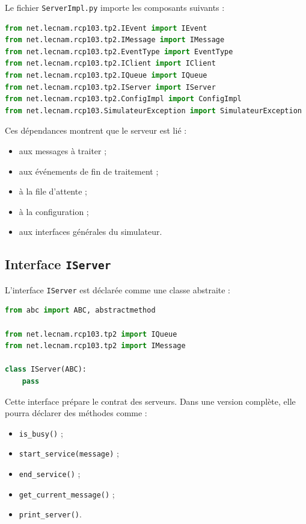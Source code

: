 \documentclass{article}
\begin{document}
Le fichier \texttt{ServerImpl.py} importe les composants suivants :

\begin{lstlisting}[language=Python, caption=Imports principaux de ServerImpl.py]
from net.lecnam.rcp103.tp2.IEvent import IEvent
from net.lecnam.rcp103.tp2.IMessage import IMessage
from net.lecnam.rcp103.tp2.EventType import EventType
from net.lecnam.rcp103.tp2.IClient import IClient
from net.lecnam.rcp103.tp2.IQueue import IQueue
from net.lecnam.rcp103.tp2.IServer import IServer
from net.lecnam.rcp103.tp2.ConfigImpl import ConfigImpl
from net.lecnam.rcp103.SimulateurException import SimulateurException
\end{lstlisting}

Ces dépendances montrent que le serveur est lié :
\begin{itemize}[leftmargin=*]
    \item aux messages à traiter ;
    \item aux événements de fin de traitement ;
    \item à la file d’attente ;
    \item à la configuration ;
    \item aux interfaces générales du simulateur.
\end{itemize}

\subsection{Interface \texttt{IServer}}

L’interface \texttt{IServer} est déclarée comme une classe abstraite :

\begin{lstlisting}[language=Python, caption=Structure de IServer.py]
from abc import ABC, abstractmethod

from net.lecnam.rcp103.tp2 import IQueue
from net.lecnam.rcp103.tp2 import IMessage

class IServer(ABC):
    pass
\end{lstlisting}

Cette interface prépare le contrat des serveurs. Dans une version complète, elle pourra déclarer des méthodes comme :
\begin{itemize}[leftmargin=*]
    \item \texttt{is\_busy()} ;
    \item \texttt{start\_service(message)} ;
    \item \texttt{end\_service()} ;
    \item \texttt{get\_current\_message()} ;
    \item \texttt{print\_server()}.
\end{itemize}
\end{document}
